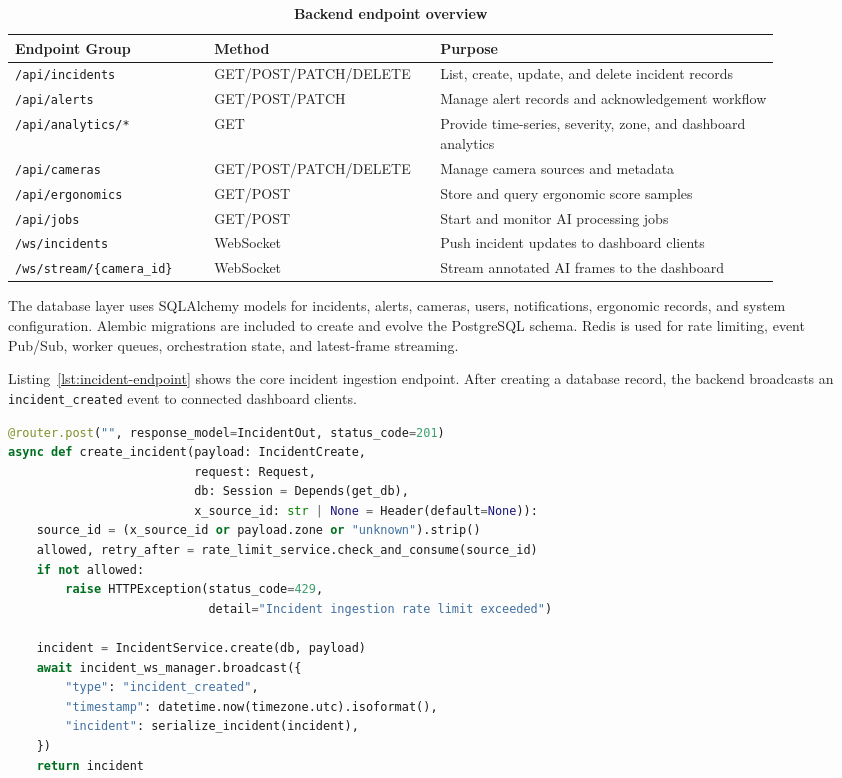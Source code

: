 \begin{table}[H]
\centering
\footnotesize
\renewcommand{\arraystretch}{1.35}
\begin{tabular}{|p{0.24\linewidth}|p{0.24\linewidth}|p{0.41\linewidth}|}
\hline
\textbf{Endpoint Group} & \textbf{Method} & \textbf{Purpose} \\
\hline
\texttt{/api/incidents} & GET/POST/PATCH/DELETE & List, create, update, and delete incident records \\
\hline
\texttt{/api/alerts} & GET/POST/PATCH & Manage alert records and acknowledgement workflow \\
\hline
\texttt{/api/analytics/*} & GET & Provide time-series, severity, zone, and dashboard analytics \\
\hline
\texttt{/api/cameras} & GET/POST/PATCH/DELETE & Manage camera sources and metadata \\
\hline
\texttt{/api/ergonomics} & GET/POST & Store and query ergonomic score samples \\
\hline
\texttt{/api/jobs} & GET/POST & Start and monitor AI processing jobs \\
\hline
\texttt{/ws/incidents} & WebSocket & Push incident updates to dashboard clients \\
\hline
\texttt{/ws/stream/\{camera\_id\}} & WebSocket & Stream annotated AI frames to the dashboard \\
\hline
\end{tabular}
\caption{\textbf{Backend endpoint overview}}
\label{tab:chapter5-api}
\end{table}

The database layer uses SQLAlchemy models for incidents, alerts, cameras, users, notifications, ergonomic records, and system configuration. Alembic migrations are included to create and evolve the PostgreSQL schema. Redis is used for rate limiting, event Pub/Sub, worker queues, orchestration state, and latest-frame streaming.

Listing~\ref{lst:incident-endpoint} shows the core incident ingestion endpoint. After creating a database record, the backend broadcasts an \texttt{incident\_created} event to connected dashboard clients.

\begin{lstlisting}[language=Python,caption={FastAPI incident ingestion endpoint},label={lst:incident-endpoint}]
@router.post("", response_model=IncidentOut, status_code=201)
async def create_incident(payload: IncidentCreate,
                          request: Request,
                          db: Session = Depends(get_db),
                          x_source_id: str | None = Header(default=None)):
    source_id = (x_source_id or payload.zone or "unknown").strip()
    allowed, retry_after = rate_limit_service.check_and_consume(source_id)
    if not allowed:
        raise HTTPException(status_code=429,
                            detail="Incident ingestion rate limit exceeded")

    incident = IncidentService.create(db, payload)
    await incident_ws_manager.broadcast({
        "type": "incident_created",
        "timestamp": datetime.now(timezone.utc).isoformat(),
        "incident": serialize_incident(incident),
    })
    return incident
\end{lstlisting}

